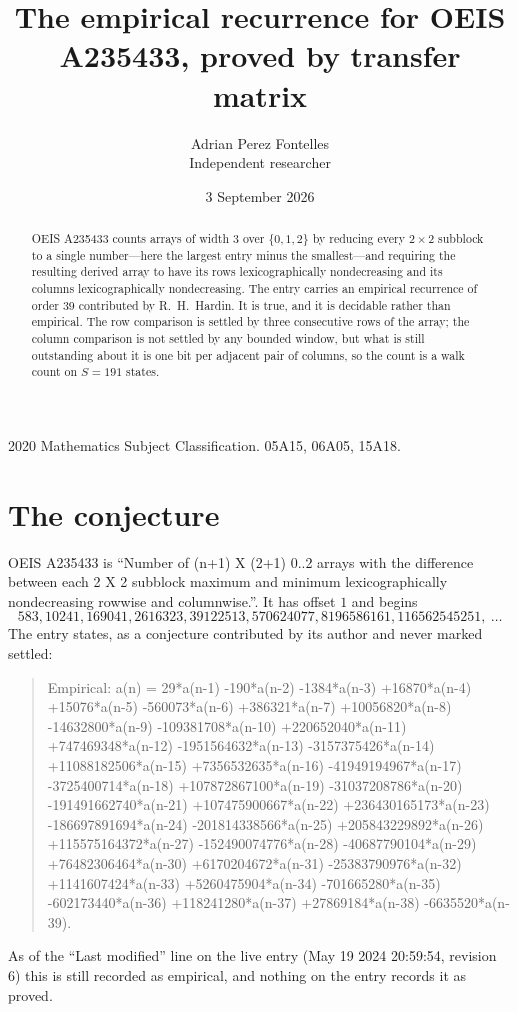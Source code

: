\documentclass[11pt,a4paper]{article}
\title{The empirical recurrence for OEIS A235433, proved by transfer matrix}
\author{Adrian Perez Fontelles\\ \small Independent researcher}
\date{3 September 2026}
\theoremstyle{plain}
\theoremstyle{definition}
\begin{document}
\maketitle

\begin{abstract}
OEIS A235433 counts arrays of width $3$ over $\{0,1,2\}$ by reducing every $2\times2$ subblock to a
single number---here the largest entry minus the smallest---and requiring the resulting derived array to have its rows
lexicographically nondecreasing and its columns lexicographically nondecreasing. The entry carries an
empirical recurrence of order $39$ contributed by R.~H.~Hardin. It is true, and it is
decidable rather than empirical. The row comparison is settled by three consecutive rows of the
array; the column comparison is not settled by any bounded window, but what is still outstanding
about it is one bit per adjacent pair of columns, so the count is a walk count on $S=191$
states.
\end{abstract}

\noindent\small 2020 Mathematics Subject Classification. 05A15, 06A05, 15A18.\normalsize

\section{The conjecture}

OEIS A235433 is ``Number of (n+1) X (2+1) 0..2 arrays with the difference between each 2 X 2 subblock maximum and minimum lexicographically nondecreasing rowwise and columnwise.''. It has offset $1$ and begins
\[
583, 10241, 169041, 2616323, 39122513, 570624077, 8196586161, 116562545251,\ \dots
\]
The entry states, as a conjecture contributed by its author and never marked settled:
\begin{quote}
Empirical: a(n) = 29*a(n-1) -190*a(n-2) -1384*a(n-3) +16870*a(n-4) +15076*a(n-5) -560073*a(n-6) +386321*a(n-7) +10056820*a(n-8) -14632800*a(n-9) -109381708*a(n-10) +220652040*a(n-11) +747469348*a(n-12) -1951564632*a(n-13) -3157375426*a(n-14) +11088182506*a(n-15) +7356532635*a(n-16) -41949194967*a(n-17) -3725400714*a(n-18) +107872867100*a(n-19) -31037208786*a(n-20) -191491662740*a(n-21) +107475900667*a(n-22) +236430165173*a(n-23) -186697891694*a(n-24) -201814338566*a(n-25) +205843229892*a(n-26) +115575164372*a(n-27) -152490074776*a(n-28) -40687790104*a(n-29) +76482306464*a(n-30) +6170204672*a(n-31) -25383790976*a(n-32) +1141607424*a(n-33) +5260475904*a(n-34) -701665280*a(n-35) -602173440*a(n-36) +118241280*a(n-37) +27869184*a(n-38) -6635520*a(n-39).
\end{quote}
As of the ``Last modified'' line on the live entry (May 19 2024 20:59:54, revision 6) this is still
recorded as empirical, and nothing on the entry records it as proved.
\end{document}
